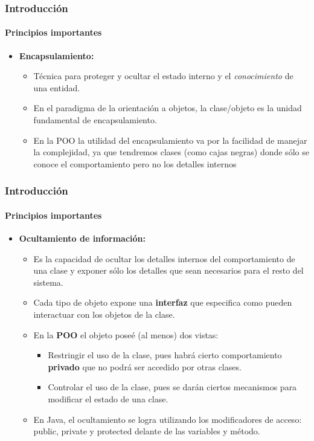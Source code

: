 \documentclass{beamer}
\begin{document}
				
		\begin{frame}
			\frametitle{Introducci\'on}
			\framesubtitle{Principios importantes}

			\begin{itemize}
				\item \textbf{Encapsulamiento:}
				\begin{itemize}
  					\item T\'ecnica para proteger y ocultar el estado interno y el {\em conocimiento} de una entidad.
					\item En el paradigma de la orientaci\'on a objetos, la clase/objeto es la unidad fundamental de encapsulamiento.
					\item En la POO la utilidad del encapsulamiento va por la facilidad de manejar la complejidad, ya que tendremos clases (como cajas negras) donde s\'olo se conoce el comportamiento pero no los detalles internos
				\end{itemize}
			\end{itemize}
		\end{frame}				
				
				
		\begin{frame}
			\frametitle{Introducci\'on}
			\framesubtitle{Principios importantes}

			\begin{itemize}
				\item \textbf{Ocultamiento de informaci\'on:}
				\begin{itemize}
					\item Es la capacidad de ocultar los detalles internos del comportamiento de una clase y exponer s\'olo los detalles que sean necesarios para el resto del sistema.
					\item Cada tipo de objeto expone una \textbf{interfaz} que especifica como pueden interactuar con los objetos de la clase.
  					\item En la \textbf{POO} el objeto pose\'e (al menos) dos vistas:
					\begin{itemize}
  						\item[] Restringir el uso de la clase, pues habr\'a cierto comportamiento \textbf{privado} que no podr\'a ser accedido por otras clases.
						\item[] Controlar el uso de la clase, pues se dar\'an ciertos mecanismos para modificar el estado de una clase.
					\end{itemize}
					\item En Java, el ocultamiento se logra utilizando los modificadores de acceso: public, private y protected delante de las variables y m\'etodo.
				\end{itemize}
			\end{itemize}
		\end{frame}
\end{document}
